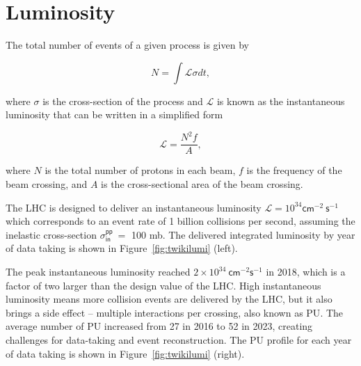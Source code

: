 \section{Luminosity}
\label{sec:Lumi}

The total number of events of a given process is given by 

\begin{equation}
N=\int\mathcal{L}\sigma dt,
\end{equation}

where $\sigma$ is the cross-section of the process and $\mathcal{L}$ is known as the instantaneous luminosity that can be written in a simplified form

\begin{equation}
\mathcal{L}=\frac{N^2f}{A},
\end{equation}

where $N$ is the total number of protons in each beam, $f$ is the frequency of the beam crossing, and $A$ is the cross-sectional area of the beam crossing.

The \ac{LHC} is designed to deliver an instantaneous luminosity $\mathcal{L}=10^{34}\textsf{cm}^{-2}~\textsf{s}^{-1}$ which corresponds to an event rate of 1 billion collisions per second, assuming the inelastic cross-section $\sigma^{\textsf{pp}}_{\textsf{in}}~=$ 100 mb. The delivered integrated luminosity by year of data taking is shown in Figure~\ref{fig:twikilumi} (left).

The peak instantaneous luminosity reached $2\times10^{34}~\textsf{cm}^{-2}\textsf{s}^{-1}$ in 2018, which is a factor of two larger than the design value of the \ac{LHC}. High instantaneous luminosity means more collision events are delivered by the \ac{LHC}, but it also brings a side effect -- multiple interactions per crossing, also known as \ac{PU}. The average number of \ac{PU} increased from 27 in 2016 to 52 in 2023, creating challenges for data-taking and event reconstruction. The \ac{PU} profile for each year of data taking is shown in Figure~\ref{fig:twikilumi} (right).


